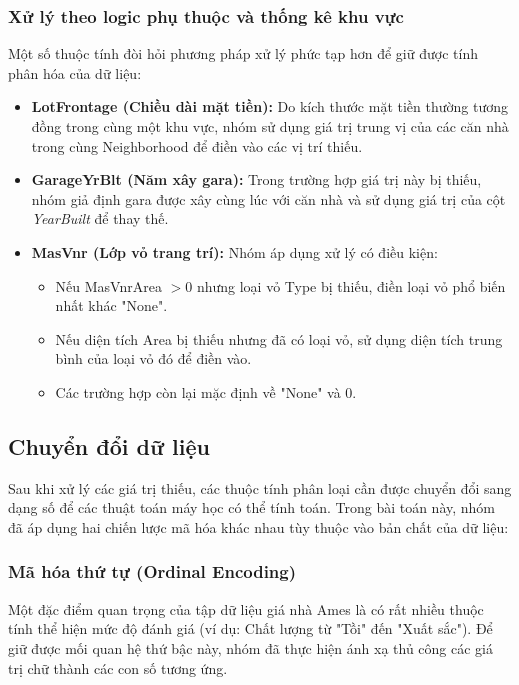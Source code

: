 \subsubsection{Xử lý theo logic phụ thuộc và thống kê khu vực}
\indent Một số thuộc tính đòi hỏi phương pháp xử lý phức tạp hơn để giữ được tính phân hóa của dữ liệu:
\begin{itemize}
    \item[-] \textbf{LotFrontage (Chiều dài mặt tiền):} Do kích thước mặt tiền thường tương đồng trong cùng một khu vực, nhóm sử dụng giá trị trung vị của các căn nhà trong cùng Neighborhood để điền vào các vị trí thiếu.
    \item[-] \textbf{GarageYrBlt (Năm xây gara):} Trong trường hợp giá trị này bị thiếu, nhóm giả định gara được xây cùng lúc với căn nhà và sử dụng giá trị của cột \textit{YearBuilt} để thay thế.
    \item[-] \textbf{MasVnr (Lớp vỏ trang trí):} Nhóm áp dụng xử lý có điều kiện:
    \begin{itemize}
        \item[+] Nếu MasVnrArea $> 0$ nhưng loại vỏ Type bị thiếu, điền loại vỏ phổ biến nhất khác "None".
        \item[+] Nếu diện tích Area bị thiếu nhưng đã có loại vỏ, sử dụng diện tích trung bình của loại vỏ đó để điền vào.
        \item[+] Các trường hợp còn lại mặc định về "None" và 0.
    \end{itemize}
\end{itemize}

\subsection{Chuyển đổi dữ liệu}

\indent Sau khi xử lý các giá trị thiếu, các thuộc tính phân loại cần được chuyển đổi sang dạng số để các thuật toán máy học có thể tính toán. Trong bài toán này, nhóm đã áp dụng hai chiến lược mã hóa khác nhau tùy thuộc vào bản chất của dữ liệu:

\subsubsection{Mã hóa thứ tự (Ordinal Encoding)}
\indent Một đặc điểm quan trọng của tập dữ liệu giá nhà Ames là có rất nhiều thuộc tính thể hiện mức độ đánh giá (ví dụ: Chất lượng từ "Tồi" đến "Xuất sắc"). Để giữ được mối quan hệ thứ bậc này, nhóm đã thực hiện ánh xạ thủ công các giá trị chữ thành các con số tương ứng.


